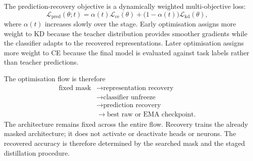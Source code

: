 The prediction-recovery objective is a dynamically weighted multi-objective loss:
\begin{equation}
\mathcal{L}_{\mathrm{pred}}(\theta;t)
=
\alpha(t)\mathcal{L}_{\mathrm{ce}}(\theta)
+
\bigl(1-\alpha(t)\bigr)\mathcal{L}_{\mathrm{kd}}(\theta),
\label{eq:recovery_pred_loss}
\end{equation}
where $\alpha(t)$ increases slowly over the stage. Early optimisation assigns more weight to KD because the teacher distribution provides smoother gradients while the classifier adapts to the recovered representations. Later optimisation assigns more weight to CE because the final model is evaluated against task labels rather than teacher predictions.

The optimisation flow is therefore
\begin{equation}
\begin{aligned}
\text{fixed mask}
&\rightarrow \text{representation recovery} \\
&\rightarrow \text{classifier unfreeze} \\
&\rightarrow \text{prediction recovery} \\
&\rightarrow \text{best raw or EMA checkpoint}.
\end{aligned}
\end{equation}
The architecture remains fixed across the entire flow. Recovery trains the already masked architecture; it does not activate or deactivate heads or neurons. The recovered accuracy is therefore determined by the searched mask and the staged distillation procedure.
